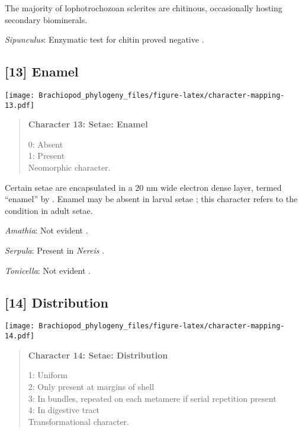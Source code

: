 \documentclass[openany]{book}
\theoremstyle{definition}
\theoremstyle{definition}
\theoremstyle{definition}
\theoremstyle{remark}
\begin{document}
The majority of lophotrochozoan sclerites are chitinous, occasionally
hosting secondary biominerals.

\hypertarget{Sipunculus-coding-12}{}
\emph{Sipunculus}: Enzymatic test for chitin proved negative
\citep{Rice1993}.

\subsection*{{[}13{]} Enamel}\label{enamel}

\texttt{[image: Brachiopod\_phylogeny\_files/figure-latex/character-mapping-13.pdf]}

\begin{quote}
\textbf{Character 13: Setae: Enamel}

0: Absent\\
1: Present\\
Neomorphic character.
\end{quote}

Certain setae are encapsulated in a 20 nm wide electron dense layer,
termed ``enamel'' by \citet{Gustus1973}. Enamel may be absent in larval
setae \citep{Luter2003}; this character refers to the condition in adult
setae.

\hypertarget{Amathia-coding-13}{}
\emph{Amathia}: Not evident \citep{Gordon1975}.

\hypertarget{Serpula-coding-13}{}
\emph{Serpula}: Present in \emph{Nereis} \citep{Gustus1973}.

\hypertarget{Tonicella-coding-13}{}
\emph{Tonicella}: Not evident \citep{Leise1988, Fischer1980}.

\subsection*{{[}14{]} Distribution}\label{distribution}

\texttt{[image: Brachiopod\_phylogeny\_files/figure-latex/character-mapping-14.pdf]}

\begin{quote}
\textbf{Character 14: Setae: Distribution}

1: Uniform\\
2: Only present at margins of shell\\
3: In bundles, repeated on each metamere if serial repetition present\\
4: In digestive tract\\
Transformational character.
\end{quote}
\end{document}
